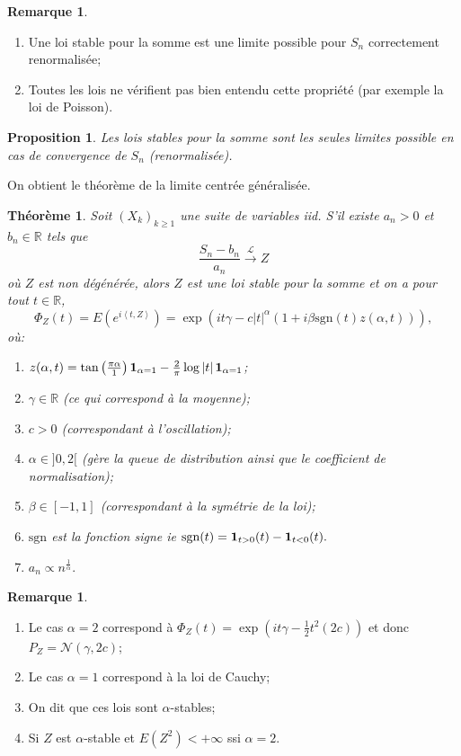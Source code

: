 \documentclass[10p,a4paper,reqno,titlepage]{report}
\newcommand{\R}{\mathbb{R}}
\newcommand{\indic}{\mathrm{{\bf 1}}}
\newcounter{dader}[chapter]
\theoremstyle{plain}
\newtheorem{thm}[thms]{Théorème}
\newtheorem{prop}[prop]{Proposition}
\theoremstyle{definition}
\newtheorem{rem}[dader]{Remarque}
\newcommand{\vabs}[1]{\left\vert #1 \right\vert}
\newcommand{\ps}[1]{\left< #1 \right>}
\newcommand{\cvloi}{\stackrel{\mathcal{L}}{\longrightarrow}}
\begin{document}
\begin{rem}\
	\begin{enumerate}
	\item Une loi stable pour la somme est une limite possible pour $S_n$ correctement renormalisée;
	\item Toutes les lois ne vérifient pas bien entendu cette propriété (par exemple la loi de Poisson).
	\end{enumerate}
\end{rem}
\begin{prop}
	Les lois stables pour la somme sont les seules limites possible en cas de convergence de $S_n$ (renormalisée).
\end{prop}
On obtient le théorème de la limite centrée généralisée.
\begin{thm}
	Soit $(X_k)_{k\geq 1}$ une suite de variables iid. S'il existe $a_n > 0$ et $b_n \in\R$ tels que
	$$ \frac{S_n - b_n}{a_n} \cvloi Z$$
	où $Z$ est non dégénérée, alors $Z$ est une loi stable pour la somme et on a pour tout $t\in \R$,
	$$ \Phi_Z (t)= E \left(e^{i \ps{t,Z}}\right)= \exp\left( it \gamma -c\vabs{t}^\alpha (1 +i \beta \mathrm{sgn}(t)z (\alpha,t))\right),$$
	où:\
	\begin{enumerate}
		\item $z(\alpha,t) = \tan\left(\frac{\pi \alpha}{1}\right) \indic_{\alpha=1}  - \frac{2}{\pi} \log\vabs{t}\indic_{\alpha=1}$;
		\item $\gamma\in \R$ (ce qui correspond à la moyenne);
		\item $c>0$ (correspondant à l'oscillation);
		\item $\alpha \in ]0,2[$ (gère la queue de distribution ainsi que le coefficient de normalisation);
		\item $\beta \in [-1,1]$ (correspondant à la symétrie de la loi);
		\item $\mathrm{sgn}$ est la fonction signe ie $\mathrm{sgn}(t)= \indic_{t>0} (t) - \indic_{t<0}(t).$
		\item $a_n \varpropto n^{\tfrac{1}{\alpha}}.$ 
	\end{enumerate}
\end{thm}
\begin{rem}\
	\begin{enumerate}
		\item Le cas $\alpha= 2$ correspond à $\Phi_Z (t)= \exp(it\gamma - \tfrac12 t^2 (2c))$ et donc $P_Z = \mathcal N (\gamma, 2c)$;
		\item Le cas $\alpha= 1$ correspond à la loi de Cauchy;
		\item On dit que ces lois sont $\alpha$-stables;
		\item Si $Z$ est $\alpha$-stable et $E(Z^2)<+\infty $ ssi $\alpha=2$.
	\end{enumerate}
\end{rem}
\end{document}
